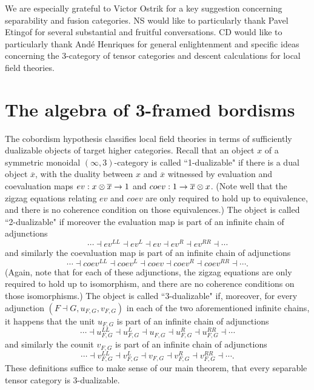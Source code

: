 \documentclass{amsart}
\begin{document}
We are especially grateful to Victor Ostrik for a key suggestion concerning separability and fusion categories.  NS would like to particularly thank Pavel Etingof for several substantial and fruitful conversations.  CD would like to particularly thank And\'e Henriques for general enlightenment and specific ideas concerning the 3-category of tensor categories and descent calculations for local field theories.







\section{The algebra of 3-framed bordisms} \label{sec:lft}


The cobordism hypothesis \cite{MR1355899, lurie-ch} classifies local field theories in terms of sufficiently dualizable objects of target higher categories.  Recall that an object $x$ of a symmetric monoidal $(\infty,3)$-category is called ``1-dualizable" if there is a dual object $\overline{x}$, with the duality between $x$ and $\overline{x}$ witnessed by evaluation and coevaluation maps $ev: x \otimes \overline{x} \rightarrow 1$ and $coev: 1 \rightarrow \overline{x} \otimes x$.  (Note well that the zigzag equations relating $ev$ and $coev$ are only required to hold up to equivalence, and there is no coherence condition on those equivalences.)  The object is called ``2-dualizable" if moreover the evaluation map is part of an infinite chain of adjunctions 
$$\cdots \dashv ev^{LL} \dashv ev^L \dashv ev \dashv ev^R \dashv ev^{RR} \dashv \cdots$$
and similarly the coevaluation map is part of an infinite chain of adjunctions 
$$\cdots \dashv coev^{LL} \dashv coev^L \dashv coev \dashv coev^R \dashv coev^{RR} \dashv \cdots.$$  
(Again, note that for each of these adjunctions, the zigzag equations are only required to hold up to isomorphism, and there are no coherence conditions on those isomorphisms.)
The object is called ``3-dualizable" if, moreover, for every adjunction $(F \dashv G, u_{F,G}, v_{F,G})$ in each of the two aforementioned infinite chains, it happens that the unit $u_{F,G}$ is part of an infinite chain of adjunctions 
$$\cdots \dashv u_{F,G}^{LL} \dashv u_{F,G}^L \dashv u_{F,G} \dashv u_{F,G}^R \dashv u_{F,G}^{RR} \dashv \cdots$$ 
and similarly the counit $v_{F,G}$ is part of an infinite chain of adjunctions 
$$\cdots \dashv v_{F,G}^{LL} \dashv v_{F,G}^L \dashv v_{F,G} \dashv v_{F,G}^R \dashv v_{F,G}^{RR} \dashv \cdots.$$  These definitions suffice to make sense of our main theorem, that every separable tensor category is 3-dualizable.  
\end{document}
